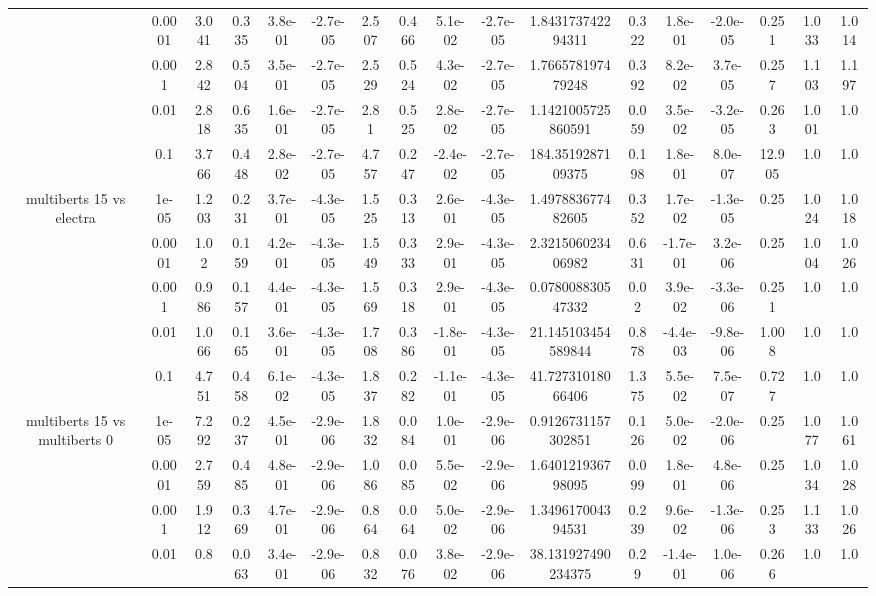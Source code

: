 \begin{tabular}{|c|c|c|c|c|c|c|c|c|c|c|c|c|c|c|c|c|}
 & 0.0001 & 3.041 & 0.335 & 3.8e-01 & -2.7e-05 & 2.507 & 0.466 & 5.1e-02 & -2.7e-05 & 1.843173742294311 & 0.322 & 1.8e-01 & -2.0e-05 & 0.251 & 1.033 & 1.014 \\
 & 0.001 & 2.842 & 0.504 & 3.5e-01 & -2.7e-05 & 2.529 & 0.524 & 4.3e-02 & -2.7e-05 & 1.766578197479248 & 0.392 & 8.2e-02 & 3.7e-05 & 0.257 & 1.103 & 1.197 \\
 & 0.01 & 2.818 & 0.635 & 1.6e-01 & -2.7e-05 & 2.81 & 0.525 & 2.8e-02 & -2.7e-05 & 1.1421005725860591 & 0.059 & 3.5e-02 & -3.2e-05 & 0.263 & 1.001 & 1.0 \\
 & 0.1 & 3.766 & 0.448 & 2.8e-02 & -2.7e-05 & 4.757 & 0.247 & -2.4e-02 & -2.7e-05 & 184.3519287109375 & 0.198 & 1.8e-01 & 8.0e-07 & 12.905 & 1.0 & 1.0 \\
\hline
\multirow{5}{*}{multiberts 15 vs electra } & 1e-05 & 1.203 & 0.231 & 3.7e-01 & -4.3e-05 & 1.525 & 0.313 & 2.6e-01 & -4.3e-05 & 1.497883677482605 & 0.352 & 1.7e-02 & -1.3e-05 & 0.25 & 1.024 & 1.018 \\
 & 0.0001 & 1.02 & 0.159 & 4.2e-01 & -4.3e-05 & 1.549 & 0.333 & 2.9e-01 & -4.3e-05 & 2.321506023406982 & 0.631 & -1.7e-01 & 3.2e-06 & 0.25 & 1.004 & 1.026 \\
 & 0.001 & 0.986 & 0.157 & 4.4e-01 & -4.3e-05 & 1.569 & 0.318 & 2.9e-01 & -4.3e-05 & 0.078008830547332 & 0.02 & 3.9e-02 & -3.3e-06 & 0.251 & 1.0 & 1.0 \\
 & 0.01 & 1.066 & 0.165 & 3.6e-01 & -4.3e-05 & 1.708 & 0.386 & -1.8e-01 & -4.3e-05 & 21.145103454589844 & 0.878 & -4.4e-03 & -9.8e-06 & 1.008 & 1.0 & 1.0 \\
 & 0.1 & 4.751 & 0.458 & 6.1e-02 & -4.3e-05 & 1.837 & 0.282 & -1.1e-01 & -4.3e-05 & 41.72731018066406 & 1.375 & 5.5e-02 & 7.5e-07 & 0.727 & 1.0 & 1.0 \\
\hline
\multirow{5}{*}{multiberts 15 vs multiberts 0} & 1e-05 & 7.292 & 0.237 & 4.5e-01 & -2.9e-06 & 1.832 & 0.084 & 1.0e-01 & -2.9e-06 & 0.9126731157302851 & 0.126 & 5.0e-02 & -2.0e-06 & 0.25 & 1.077 & 1.061 \\
 & 0.0001 & 2.759 & 0.485 & 4.8e-01 & -2.9e-06 & 1.086 & 0.085 & 5.5e-02 & -2.9e-06 & 1.640121936798095 & 0.099 & 1.8e-01 & 4.8e-06 & 0.25 & 1.034 & 1.028 \\
 & 0.001 & 1.912 & 0.369 & 4.7e-01 & -2.9e-06 & 0.864 & 0.064 & 5.0e-02 & -2.9e-06 & 1.349617004394531 & 0.239 & 9.6e-02 & -1.3e-06 & 0.253 & 1.133 & 1.026 \\
 & 0.01 & 0.8 & 0.063 & 3.4e-01 & -2.9e-06 & 0.832 & 0.076 & 3.8e-02 & -2.9e-06 & 38.131927490234375 & 0.29 & -1.4e-01 & 1.0e-06 & 0.266 & 1.0 & 1.0 \\

\end{tabular}
